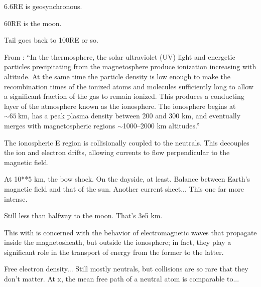 6.6RE is geosynchronous. 

60RE is the moon. 

Tail goes back to 100RE or so. 


From \cite{paschmann_2003}: ``In the thermosphere, the solar ultraviolet (UV) light and energetic particles precipitating from the magnetosphere produce ionization increasing with altitude. At the same time the particle density is low enough to make the recombination times of the ionized atoms and molecules sufficiently long to allow a significant fraction of the gas to remain ionized. This produces a conducting layer of the atmosphere known as the ionosphere. The ionosphere begins at $\sim\SI{65}{\km}$, has a peak plasma density between 200 and 300 km, and eventually merges with magnetospheric regions $\sim$1000--2000 km altitudes.''

The ionospheric E region is collisionally coupled to the neutrals. This decouples the ion and electron drifts, allowing currents to flow perpendicular to the magnetic field. 



At 10**5 km, the bow shock. On the dayside, at least. Balance between Earth's magnetic field and that of the sun. Another current sheet... This one far more intense.

Still less than halfway to the moon. That's 3e5 km.

This with is concerned with the behavior of electromagnetic waves that propagate inside the magnetosheath, but outside the ionosphere; in fact, they play a significant role in the transport of energy from the former to the latter. 

Free electron density... Still mostly neutrals, but collisions are so rare that they don't matter. At x, the mean free path of a neutral atom is comparable to... 

